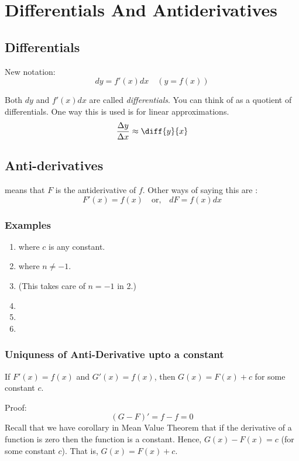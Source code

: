 

\chapter{Differentials And Antiderivatives}

\bigbreak

\section{Differentials}

New notation:
$$ \boxed{ dy = f'(x)dx } \quad ( y = f(x) ) $$

Both $dy$ and $f'(x)dx$ are called \textit{differentials}. 
You can think of  as a quotient of differentials.
One way this is used is for linear approximations.
$$\frac{\Delta y}{\Delta x} \approx \diff{y}{x} $$

\section{Anti-derivatives}
 means that $F$ is the antiderivative of $f$.
Other ways of saying this are :
$$ F'(x) = f(x) \quad \text{or,} \quad dF = f(x)dx $$

\subsection*{Examples}
\begin{enumerate}
	\item {} where $c$ is any constant.
	\item {} where $n \neq -1$.
	\item {} (This takes care of $n = -1$ in 2.)
	\item {}
	\item {}
	\item {}
\end{enumerate}


\subsection*{Uniquness of Anti-Derivative upto a constant}
If $F'(x) = f(x)$ and $G'(x) = f(x)$, then $G(x) = F(x) + c$ for some constant $c$.

Proof: $$(G-F)' = f - f = 0$$
Recall that we have corollary in Mean Value Theorem that if the derivative of a function is zero then the function is a constant.
Hence, $G(x) - F(x) = c$ (for some constant $c$). That is, $G(x) = F(x) +c$.
